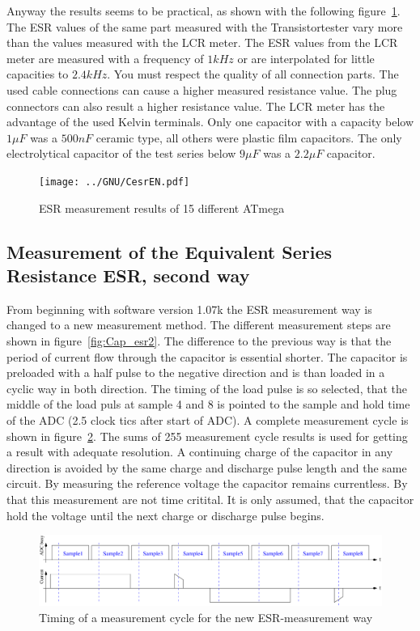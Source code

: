 Anyway the results seems to be practical, as shown with the following figure~\ref{fig:Cesr}.
The ESR values of the same part measured with the Transistortester vary more than the values measured with the LCR meter.
The ESR values from the LCR meter are measured with a frequency of \(1kHz\) or are interpolated for little capacities to
\(2.4kHz\).
You must respect the quality of all connection parts. The used cable connections can cause a higher measured resistance value.
The plug connectors can also result a higher resistance value.
The LCR meter has the advantage of the used Kelvin terminals.
Only one capacitor with a capacity below \(1\mu F\) was a \(500nF\) ceramic type, all others were
plastic film capacitors.
The only electrolytical capacitor of the test series below \(9\mu F\) was a \(2.2\mu F\) capacitor.

\begin{figure}[H]
\centering
\texttt{[image: ../GNU/CesrEN.pdf]}
\caption{ESR measurement results of 15 different ATmega}
\label{fig:Cesr}
\end{figure}


\subsection{Measurement of the Equivalent Series Resistance ESR, second way}
\label{sec:ESR2}
From beginning with software version 1.07k the ESR measurement way is changed to a new measurement method.
The different measurement steps are shown in figure~\ref{fig:Cap_esr2}. The difference to the previous way is that
the period of current flow through the capacitor is essential shorter.
The capacitor is preloaded with a half pulse to the negative direction and is than loaded in a cyclic way in both
direction.
The timing of the load pulse is so selected, that the middle of the load puls at sample 4 and 8 is
pointed to the sample and hold time of the ADC (2.5 clock tics after start of ADC). 
A complete measurement cycle is shown in figure~\ref{fig:Cap_esr2_timing}.
The sums of 255 measurement cycle results is used for getting a result with adequate resolution. 
A continuing charge of the capacitor in any direction is avoided by the same charge and discharge pulse length
and the same circuit.
By measuring the reference voltage the capacitor remains currentless. By that this measurement are not time critital.
It is only assumed, that the capacitor hold the voltage until the next charge or discharge pulse begins.

\begin{figure}[H]
  \centering
    \includegraphics[width=1.\textwidth]{../FIG/Cap_esr2_timing.pdf}
  \caption{Timing of a measurement cycle for the new ESR-measurement way}
  \label{fig:Cap_esr2_timing}
\end{figure}

